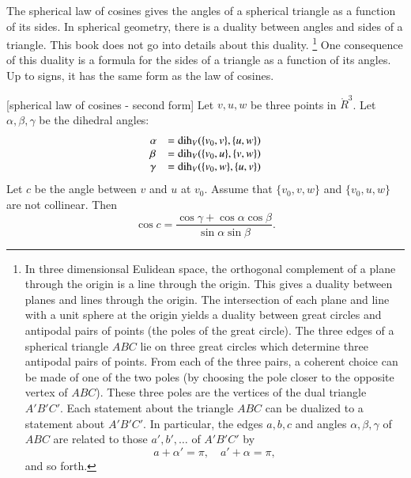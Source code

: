 The spherical law of cosines gives the angles of a spherical
triangle as a function of its sides.  In spherical geometry,
there is a duality between angles and sides of a triangle.
This book does not go into details about this duality.%
\footnote{In three dimensionsal Eulidean space, the orthogonal
complement of a plane through the origin is a line through
the origin.  This gives a duality between planes and lines
through the origin.  The intersection of each plane and line with
a unit sphere at the origin yields a duality between great
circles and antipodal
pairs of points (the poles of the great circle).  The three edges
of a spherical triangle $ABC$ lie on three great circles which
determine three
antipodal pairs of points.  From each of the three  pairs, 
a coherent
choice can be made of one of the two poles (by choosing the pole
closer to the opposite vertex of $ABC$).  
These three poles are the vertices
of the dual triangle $A'B'C'$.  Each statement about the triangle $ABC$
can be dualized to a statement about $A'B'C'$.
In particular, the edges $a,b,c$ and angles $\alpha,\beta,\gamma$ of $ABC$ 
are related to those $a',b',\ldots$ of $A'B'C'$ by
   $$
   a + \alpha' = \pi,\quad a' + \alpha= \pi,
   $$
and so forth.
}  
One
consequence of this duality is a formula for the sides of
a triangle as a function of its angles.  Up to signs,
it has the same form as the law of cosines.

\begin{lemma}[spherical law of cosines - second form]
Let $v,u,w$ be three points in $\ring{R}^3$.
Let $\alpha,\beta,\gamma$ be the dihedral angles: 
   $$
   \begin{array}{lll}
     \alpha &= \operatorname{dih}_V(\{v_0,v\},\{u,w\})\\
     \beta &= \operatorname{dih}_V(\{v_0,u\},\{v,w\})\\
     \gamma&= \operatorname{dih}_V(\{v_0,w\},\{u,v\})\\
     \end{array}
   $$
Let $c$ be the
angle between $v$ and $u$ at $v_0$. 
Assume that $\{v_0,v,w\}$ and $\{v_0,u,w\}$ are not collinear.
Then
    $$
    \cos c = \frac{\cos \gamma + \cos \alpha \cos \beta}
     {\sin \alpha\sin \beta}.
    $$
\end{lemma}

